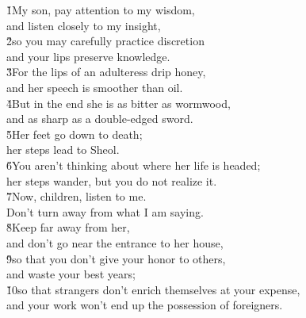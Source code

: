 \begin{poetry}
\poeml {}
\v{1}My son, pay attention to my wisdom, \\
\poeml and listen closely to my insight, \\
\poeml \v{2}so you may carefully practice discretion \\
\poemll    and your lips preserve knowledge. \\
\poeml \v{3}For the lips of an adulteress drip honey, \\
\poemll    and her speech is smoother than oil. \\
\poeml \v{4}But in the end she is as bitter as wormwood, \\
\poemll    and as sharp as a double-edged sword. \\
\poeml \v{5}Her feet go down to death; \\
\poemll    her steps lead to Sheol. \\
\poeml \v{6}You aren't thinking about where her life is headed; \\
\poemll    her steps wander, but you do not realize it. \\
\poeml \v{7}Now, children, listen to me. \\
\poemll    Don't turn away from what I am saying. \\
\poeml \v{8}Keep far away from her, \\
\poemll    and don't go near the entrance to her house, \\
\poeml \v{9}so that you don't give your honor to others, \\
\poemll    and waste your best years; \\
\poeml \v{10}so that strangers don't enrich themselves at your expense, \\
\poemll    and your work won't end up the possession of foreigners. \\

\end{poetry}
